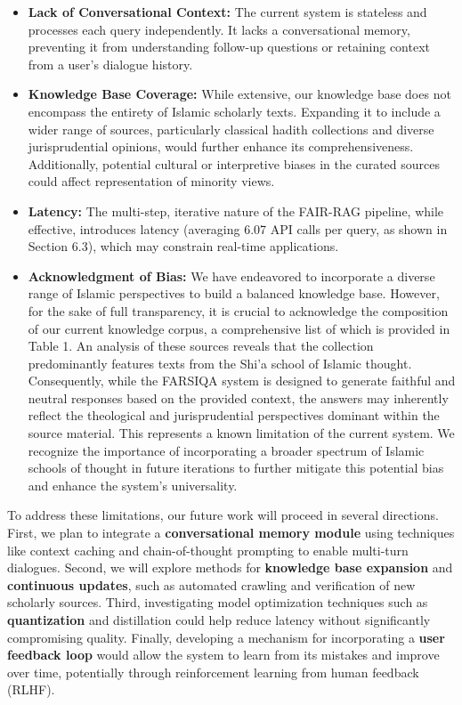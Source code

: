 \documentclass[11pt]{article}
\begin{document}
\begin{itemize}
    \item \textbf{Lack of Conversational Context:} The current system is stateless and processes each query independently. It lacks a conversational memory, preventing it from understanding follow-up questions or retaining context from a user's dialogue history.
    \item \textbf{Knowledge Base Coverage:} While extensive, our knowledge base does not encompass the entirety of Islamic scholarly texts. Expanding it to include a wider range of sources, particularly classical hadith collections and diverse jurisprudential opinions, would further enhance its comprehensiveness. Additionally, potential cultural or interpretive biases in the curated sources could affect representation of minority views.
    \item \textbf{Latency:} The multi-step, iterative nature of the FAIR-RAG pipeline, while effective, introduces latency (averaging 6.07 API calls per query, as shown in Section 6.3), which may constrain real-time applications.
    \item \textbf{Acknowledgment of Bias:} We have endeavored to incorporate a diverse range of Islamic perspectives to build a balanced knowledge base. However, for the sake of full transparency, it is crucial to acknowledge the composition of our current knowledge corpus, a comprehensive list of which is provided in Table 1. An analysis of these sources reveals that the collection predominantly features texts from the Shi'a school of Islamic thought. Consequently, while the FARSIQA system is designed to generate faithful and neutral responses based on the provided context, the answers may inherently reflect the theological and jurisprudential perspectives dominant within the source material. This represents a known limitation of the current system. We recognize the importance of incorporating a broader spectrum of Islamic schools of thought in future iterations to further mitigate this potential bias and enhance the system's universality.
\end{itemize}

To address these limitations, our future work will proceed in several directions. First, we plan to integrate a \textbf{conversational memory module} using techniques like context caching and chain-of-thought prompting \cite{wei2022chain} to enable multi-turn dialogues. Second, we will explore methods for \textbf{knowledge base expansion} and \textbf{continuous updates}, such as automated crawling and verification of new scholarly sources. Third, investigating model optimization techniques such as \textbf{quantization} \cite{dettmers2023qlora} and distillation could help reduce latency without significantly compromising quality. Finally, developing a mechanism for incorporating a \textbf{user feedback loop} would allow the system to learn from its mistakes and improve over time, potentially through reinforcement learning from human feedback (RLHF).
\end{document}
